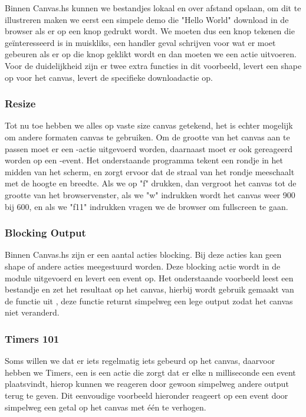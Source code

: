 Binnen Canvas.hs kunnen we bestandjes lokaal en over afstand opslaan, om dit te illustreren maken we eerst een simpele demo die "Hello World" download in de browser als er op een knop gedrukt wordt. We moeten dus een knop tekenen die geïnteresseerd is in muiskliks, een handler geval schrijven voor wat er moet gebeuren als er op die knop geklikt wordt en dan moeten we een  actie uitvoeren. Voor de duidelijkheid zijn er twee extra functies in dit voorbeeld,  levert een shape op voor het canvas,  levert de specifieke downloadactie op.



\subsubsection{Resize}

Tot nu toe hebben we alles op vaste size canvas getekend, het is echter mogelijk om andere formaten canvas te gebruiken. Om de grootte van het canvas aan te passen moet er een -actie uitgevoerd worden, daarnaast moet er ook gereageerd worden op een -event. Het onderstaande programma tekent een rondje in het midden van het scherm, en zorgt ervoor dat de straal van het rondje meeschaalt met de hoogte en breedte. Als we op "f" drukken, dan vergroot het canvas tot de grootte van het browservenster, als we "w" indrukken wordt het canvas weer 900 bij 600, en als we "f11" indrukken vragen we de browser om fullscreen te gaan.



\subsubsection{Blocking Output}
Binnen Canvas.hs zijn er een aantal acties blocking. Bij deze acties kan geen shape of andere acties meegestuurd worden. Deze blocking actie wordt in de module uitgevoerd en levert een event op. Het onderstaande voorbeeld leest een bestandje en zet het resultaat op het canvas, hierbij wordt gebruik gemaakt van de  functie uit , deze functie returnt simpelweg een lege output zodat het canvas niet veranderd.



\subsubsection{Timers 101}
Soms willen we dat er iets regelmatig iets gebeurd op het canvas, daarvoor hebben we Timers, een  is een actie die zorgt dat er elke n milliseconde een event plaatsvindt, hierop kunnen we reageren door gewoon simpelweg andere output terug te geven. Dit eenvoudige voorbeeld hieronder reageert op een  event door simpelweg een getal op het canvas met één te verhogen.

